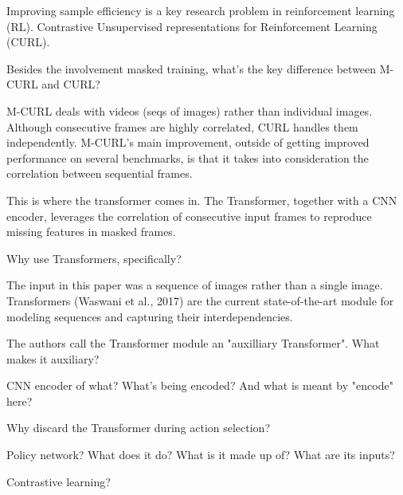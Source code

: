 Improving sample efficiency is a key research problem in reinforcement learning (RL). Contrastive Unsupervised representations for Reinforcement Learning (CURL).


\begin{quest}
	\item Besides the involvement masked training, what's the key difference between M-CURL and CURL?
	\begin{ans}
		M-CURL deals with videos (seqs of images) rather than individual images. Although consecutive frames are highly correlated, CURL handles them independently. M-CURL's main improvement, outside of getting improved performance on several benchmarks, is that it takes into consideration the correlation between sequential frames.  

		This is where the transformer comes in. The Transformer, together with a CNN encoder, leverages the correlation of consecutive input frames to reproduce missing features in masked frames.  
	\end{ans}
	
	\item Why use Transformers, specifically?
	\begin{ans}
		The input in this paper was a sequence of images rather than a single image. Transformers (Waswani et al., 2017) are the current state-of-the-art module for modeling sequences and capturing their interdependencies.  
	\end{ans}

	\item The authors call the Transformer module an "auxilliary Transformer". What makes it auxiliary? 

	\item CNN encoder of what? What's being encoded? And what is meant by "encode" here?
	\begin{ans}

	\end{ans}

	\item Why discard the Transformer during action selection?

	\item Policy network? What does it do? What is it made up of? What are its inputs?

	\item Contrastive learning?
\end{quest}









